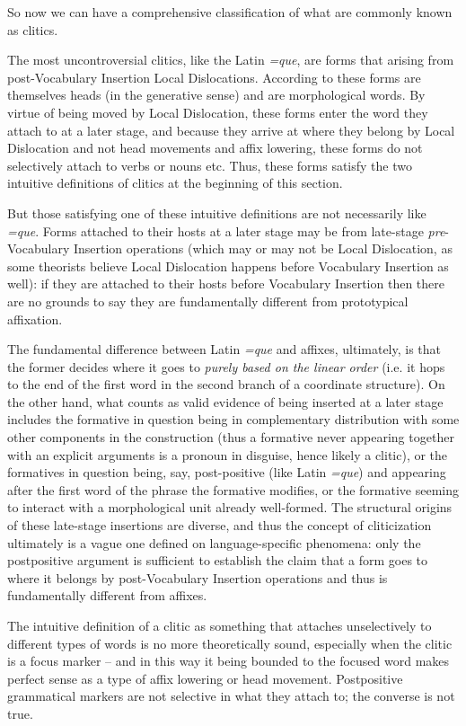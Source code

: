 \documentclass[a4paper, oneside, scheme=plain, 12pt]{article}
\newcommand{\form}[1]{\emph{#1}}
\begin{document}
So now we can have a comprehensive classification of what are commonly known as clitics.

The most uncontroversial clitics, like the Latin \form{=que},
are forms that arising from post-Vocabulary Insertion Local Dislocations.
According to \citet{embick2007linearization} these forms are themselves heads (in the generative sense) and are morphological words. 
By virtue of being moved by Local Dislocation, these forms enter the word they attach to at a later stage, and because they arrive at where they belong by Local Dislocation and not head movements and affix lowering, these forms do not selectively attach to verbs or nouns etc.
Thus, these forms satisfy the two intuitive definitions of clitics at the beginning of this section. 

But those satisfying one of these intuitive definitions are not necessarily like \form{=que}.
Forms attached to their hosts at a later stage may be from late-stage \emph{pre}-Vocabulary Insertion operations (which may or may not be Local Dislocation, as some theorists believe Local Dislocation happens before Vocabulary Insertion as well):
if they are attached to their hosts before Vocabulary Insertion then there are no grounds to say they are fundamentally different from prototypical affixation.

The fundamental difference between Latin \form{=que} and affixes, ultimately,
is that the former decides where it goes to \emph{purely based on the linear order} 
(i.e. it hops to the end of the first word in the second branch of a coordinate structure).
On the other hand, what counts as valid evidence of being inserted at a later stage includes 
the formative in question being in complementary distribution with some other components in the construction
(thus a formative never appearing together with an explicit arguments is a pronoun in disguise,
hence likely a clitic),
or the formatives in question being, say, post-positive (like Latin \form{=que}) and appearing after the first word of the phrase the formative modifies,
or the formative seeming to interact with a morphological unit already well-formed.
The structural origins of these late-stage insertions are diverse,
and thus the concept of cliticization ultimately is a vague one defined on language-specific phenomena:
only the postpositive argument is sufficient to establish the claim that a form goes to where it belongs by post-Vocabulary Insertion operations and thus is fundamentally different from affixes.

The intuitive definition of a clitic as something that attaches unselectively to different types of words is no more theoretically sound,
especially when the clitic is a focus marker -- and in this way it being bounded to the focused word makes perfect sense as a type of affix lowering or head movement. 
Postpositive grammatical markers are not selective in what they attach to; 
the converse is not true.
\end{document}
